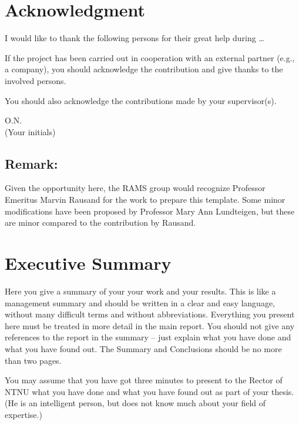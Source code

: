 \documentclass[12pt]{report}
\begin{document}
\section*{Acknowledgment}
I would like to thank the following persons for their great help during \ldots

If the project has been carried out in cooperation with an external partner (e.g., a company), you should acknowledge the contribution and give thanks to the involved persons.

You should also acknowledge the contributions made by your supervisor(s). 


\begin{flushright}
O.N.\\[1pc]
(Your initials)
\end{flushright}

\subsection*{Remark:}
Given the opportunity here, the RAMS group would recognize Professor Emeritus Marvin Rausand for the work to prepare this template. Some minor modifications have been proposed by Professor Mary Ann Lundteigen, but these are minor compared to the contribution by Rausand.



\section*{Executive Summary}
Here you give a summary of your your work and your results. This is like a management summary and should be written in a clear and easy language, without many difficult terms and without abbreviations. Everything you present here must be treated in more detail in the main report. You should not give any references to the report in the summary -- just explain what you have done and what you have found out. The Summary and Conclusions should be no more than two pages.

You may assume that you have got three minutes to present to the Rector of NTNU  what you have done and what you have found out as part of your thesis. (He is an intelligent person, but does not know much about your field of expertise.)
\tableofcontents
\setcounter{page}{0}
\end{document}
